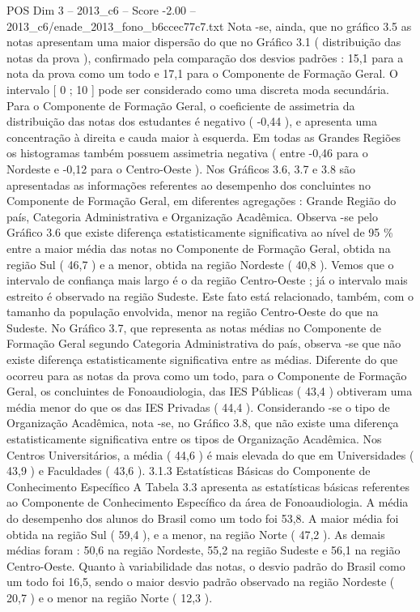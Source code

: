 \begin{textsample}{POS Dim 3 – 2013\_c6 – Score -2.00 – 2013\_c6/enade\_2013\_fono\_b6ccec77c7.txt}
Nota -se, ainda, que no gráfico 3.5 as notas apresentam uma maior dispersão do que no Gráfico 3.1 ( distribuição das notas da prova ), confirmado pela comparação dos desvios padrões : 15,1 para a nota da prova como um todo e 17,1 para o Componente de Formação Geral.
O intervalo [ 0 ; 10 ] pode ser considerado como uma discreta moda secundária.
Para o Componente de Formação Geral, o coeficiente de assimetria da distribuição das notas dos estudantes é negativo ( -0,44 ), e apresenta uma concentração à direita e cauda maior à esquerda.
Em todas as Grandes Regiões os histogramas também possuem assimetria negativa ( entre -0,46 para o Nordeste e -0,12 para o Centro-Oeste ).
Nos Gráficos 3.6, 3.7 e 3.8 são apresentadas as informações referentes ao desempenho dos concluintes no Componente de Formação Geral, em diferentes agregações : Grande Região do país, Categoria Administrativa e Organização Acadêmica.
Observa -se pelo Gráfico 3.6 que existe diferença estatisticamente significativa ao nível de 95 \% entre a maior média das notas no Componente de Formação Geral, obtida na região Sul ( 46,7 ) e a menor, obtida na região Nordeste ( 40,8 ).
Vemos que o intervalo de confiança mais largo é o da região Centro-Oeste ; já o intervalo mais estreito é observado na região Sudeste.
Este fato está relacionado, também, com o tamanho da população envolvida, menor na região Centro-Oeste do que na Sudeste.
No Gráfico 3.7, que representa as notas médias no Componente de Formação Geral segundo Categoria Administrativa do país, observa -se que não existe diferença estatisticamente significativa entre as médias.
Diferente do que ocorreu para as notas da prova como um todo, para o Componente de Formação Geral, os concluintes de Fonoaudiologia, das IES Públicas ( 43,4 ) obtiveram uma média menor do que os das IES Privadas ( 44,4 ).
Considerando -se o tipo de Organização Acadêmica, nota -se, no Gráfico 3.8, que não existe uma diferença estatisticamente significativa entre os tipos de Organização Acadêmica.
Nos Centros Universitários, a média ( 44,6 ) é mais elevada do que em Universidades ( 43,9 ) e Faculdades ( 43,6 ). 3.1.3 Estatísticas Básicas do Componente de Conhecimento Específico A Tabela 3.3 apresenta as estatísticas básicas referentes ao Componente de Conhecimento Específico da área de Fonoaudiologia.
A média do desempenho dos alunos do Brasil como um todo foi 53,8.
A maior média foi obtida na região Sul ( 59,4 ), e a menor, na região Norte ( 47,2 ).
As demais médias foram : 50,6 na região Nordeste, 55,2 na região Sudeste e 56,1 na região Centro-Oeste.
Quanto à variabilidade das notas, o desvio padrão do Brasil como um todo foi 16,5, sendo o maior desvio padrão observado na região Nordeste ( 20,7 ) e o menor na região Norte ( 12,3 ).

\end{textsample}
